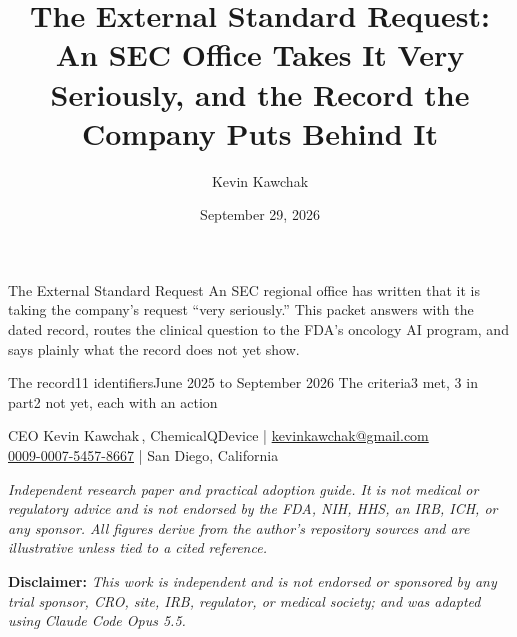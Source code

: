 \documentclass[11pt]{article}
\title{The External Standard Request: An SEC Office Takes It Very Seriously, and the Record the Company Puts Behind It}
\author{Kevin Kawchak}
\date{September 29, 2026}
\begin{document}
\thispagestyle{plain}

%
{The External Standard Request}%
{An SEC regional office has written that it is taking the company's request ``very seriously.''
This packet answers with the dated record, routes the clinical question to the FDA's oncology
AI program, and says plainly what the record does not yet show.}

\vspace{0.15em}

\begin{center}
 \enspace {} \enspace
{} \enspace {} \enspace
{}
\end{center}

\vspace{-0.15em}

%
{The record}{11 identifiers}{June 2025 to September 2026}%
{The criteria}{3 met, 3 in part}{2 not yet, each with an action}

\vspace{-0.1em}
\apprule{0.9pt}

\begin{center}\small
CEO Kevin Kawchak\,, ChemicalQDevice \;|\;
\href{mailto:kevinkawchak@gmail.com}{kevinkawchak@gmail.com}\\
\href{https://orcid.org/0009-0007-5457-8667}{0009-0007-5457-8667} \;|\;
San Diego, California
\end{center}

\vspace{-0.25em}
\apprule{0.5pt}

\noindent\footnotesize\textit{Independent research paper and practical adoption
guide. It is not medical or regulatory advice and is not endorsed by the FDA,
NIH, HHS, an IRB, ICH, or any sponsor. All figures derive from the author's
repository sources and are illustrative unless tied to a cited
reference.}\normalsize\par

\vspace{0.12em}

\noindent\footnotesize\textbf{Disclaimer:} \textit{This work is independent and
is not endorsed or sponsored by any trial sponsor, CRO, site, IRB, regulator, or
medical society; and was adapted using Claude Code Opus 5.5.}\normalsize\par
\end{document}
